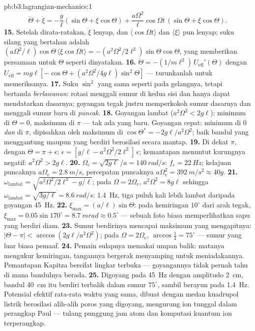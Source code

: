 \begin{solution}{pb:b3:lagrangian-mechanics:1}
\[
\ddot\Theta + \ddot\xi = -\frac{g}{\ell}(\sin\Theta + \xi\cos\Theta)
 + \frac{a\Omega^2}{\ell}\cos\Omega t\,(\sin\Theta + \xi\cos\Theta) .
\]
\textbf{15.} Setelah dirata-ratakan, $\ddot\xi$ lenyap, dan
$\langle\cos\Omega t\rangle$ dan $\langle\xi\rangle$ pun lenyap;
suku silang yang bertahan adalah
$(a\Omega^2/\ell)\cos\Theta\,\langle\xi\cos\Omega t\rangle =
-(a^2\Omega^2/2\ell^2)\sin\Theta\cos\Theta$, yang memberikan persamaan
untuk $\Theta$ seperti dinyatakan.
\textbf{16.} $\ddot\Theta = -(1/m\ell^2)\,U_{\text{eff}}'(\Theta)$ dengan
$U_{\text{eff}} = mg\ell[-\cos\Theta + (a^2\Omega^2/4g\ell)
\sin^2\Theta]$ --- turunkanlah untuk memeriksanya.
\textbf{17.} Suku $\sin^2$ yang sama seperti pada gelangnya, tetapi
bertanda \emph{berlawanan}: rotasi menggali sumur di kedua sisi dan
hanya dapat mendatarkan dasarnya; goyangan tegak justru memperkokoh
sumur dasarnya dan menggali sumur baru di \emph{puncak}.
\textbf{18.} Goyangan lambat ($a^2\Omega^2 < 2g\ell$): minimum di $\Theta =
0$, maksimum di $\pi$ --- tak ada yang baru. Goyangan cepat: minimum di $0$
\emph{dan} di $\pi$, dipisahkan oleh maksimum di $\cos\Theta^* =
-2g\ell/a^2\Omega^2$; baik bandul yang menggantung maupun yang berdiri
berosilasi secara mantap.
\textbf{19.} Di dekat $\pi$, dengan $\Theta = \pi + \epsilon$:
$\ddot\epsilon = [g/\ell - a^2\Omega^2/2\ell^2]\,\epsilon$; kemantapan
menuntut kurungnya negatif: $a^2\Omega^2 > 2g\ell$.
\textbf{20.} $\Omega_{\text{c}} = \sqrt{2g\ell}/a = \qty{140}{rad/s}$:
$f_{\text{c}} = \qty{22}{Hz}$; kelajuan puncaknya $a\Omega_{\text{c}} =
\qty{2.8}{m/s}$, percepatan puncaknya $a\Omega_{\text{c}}^2 =
\qty{392}{m/s^2} \approx 40g$.
\textbf{21.} $\omega_{\text{lambat}} = \sqrt{a^2\Omega^2/2\ell^2 -
g/\ell}$; pada $\Omega = 2\Omega_{\text{c}}$, $a^2\Omega^2 = 8g\ell$ sehingga
$\omega_{\text{lambat}} = \sqrt{3g/\ell} = \qty{8.6}{rad/s}$:
\qty{1.4}{Hz}, tiga puluh kali lebih lambat daripada goyangan \qty{45}{Hz}.
\textbf{22.} $\xi_{\max} = (a/\ell)\sin\Theta$: pada kemiringan $10^\circ$
dari arah tegak, $\xi_{\max} = 0.05\sin170^\circ = \qty{8.7}{mrad}
\approx 0.5^\circ$ --- sebuah foto biasa memperlihatkan sapu yang berdiri
diam.
\textbf{23.} Sumur berdirinya mencapai maksimum yang mengapitnya:
$|\Theta - \pi| < \arccos(2g\ell/a^2\Omega^2)$; pada $\Omega =
2\Omega_{\text{c}}$, $\arccos\tfrac14 = 75^\circ$ --- sumur yang luar
biasa pemaaf.
\textbf{24.} Pemain sulapnya memakai umpan balik: matanya mengukur
kemiringan, tangannya bergerak menyamping untuk meniadakannya.
Pemantapan Kapitza bersifat lingkar terbuka --- goyangannya tidak pernah
tahu di mana bandulnya berada.
\textbf{25.} Digoyang pada \qty{45}{Hz} dengan amplitudo \qty{2}{cm},
bandul \qty{40}{cm} itu berdiri terbalik dalam sumur $75^\circ$, sambil
berayun pada \qty{1.4}{Hz}. Potensial efektif rata-rata waktu yang sama,
dibuat dengan medan kuadrupol listrik berosilasi alih-alih poros yang
digoyang, mengurung ion tunggal dalam perangkap Paul --- tulang punggung
jam atom dan komputasi kuantum ion terperangkap.
\end{solution}
